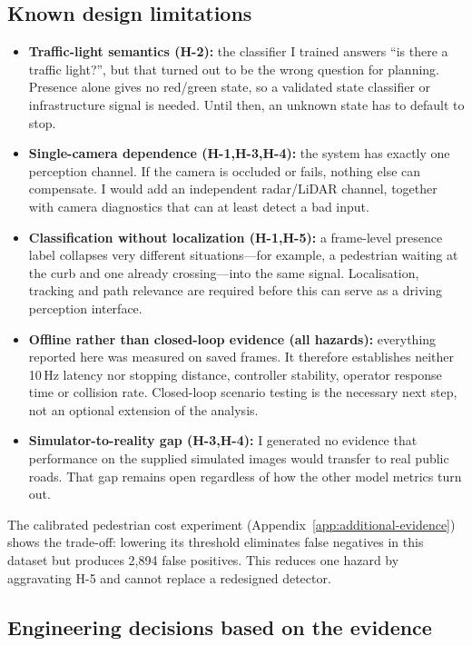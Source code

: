 \documentclass[nologo,a4paper,12pt]{article}
\begin{document}
\subsection{Known design limitations}

\begin{itemize}
  \item \textbf{Traffic-light semantics (H-2):} the classifier I trained answers ``is there a
  traffic light?'', but that turned out to be the wrong question for planning. Presence alone gives
  no red/green state, so a validated state classifier or infrastructure signal is needed. Until then,
  an unknown state has to default to stop.
  \item \textbf{Single-camera dependence (H-1,H-3,H-4):} the system has exactly one perception
  channel. If the camera is occluded or fails, nothing else can compensate. I would add an independent
  radar/LiDAR channel, together with camera diagnostics that can at least detect a bad input.
  \item \textbf{Classification without localization (H-1,H-5):} a frame-level presence label
  collapses very different situations---for example, a pedestrian waiting at the curb and one already
  crossing---into the same signal. Localisation, tracking and path relevance are required before this
  can serve as a driving perception interface.
  \item \textbf{Offline rather than closed-loop evidence (all hazards):} everything reported here
  was measured on saved frames. It therefore establishes neither 10\,Hz latency nor stopping distance,
  controller stability, operator response time or collision rate. Closed-loop scenario testing is the
  necessary next step, not an optional extension of the analysis.
  \item \textbf{Simulator-to-reality gap (H-3,H-4):} I generated no evidence that performance on
  the supplied simulated images would transfer to real public roads. That gap remains open regardless
  of how the other model metrics turn out.
\end{itemize}

The calibrated pedestrian cost experiment (Appendix~\ref{app:additional-evidence}) shows the trade-off:
lowering its threshold eliminates false negatives in this dataset but produces 2,894 false positives.
This reduces one hazard by aggravating H-5 and cannot replace a redesigned detector.

\clearpage
\subsection{Engineering decisions based on the evidence}
\end{document}
